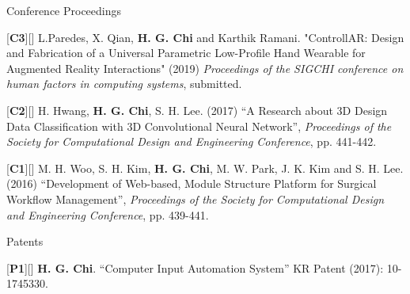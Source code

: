 \begin{cventries}
\cvpub
{Conference Proceedings} %
{ %
\begin{cvitems}
\item {[\textbf{C3}][\href{https://docs.google.com/viewer?url=https://github.com/stnoah1/CV/raw/master/documents/ControllAR.pdf}{}] L.Paredes, X. Qian, \textbf{H. G. Chi} and Karthik Ramani. "ControllAR: Design and Fabrication of a Universal Parametric Low-Profile Hand Wearable for Augmented Reality Interactions" (2019) \textit{Proceedings of the SIGCHI conference on human factors in computing systems}, submitted.}
\item {[\textbf{C2}][\href{https://docs.google.com/viewer?url=https://github.com/stnoah1/CV/raw/master/documents/3DM.pdf}{}] H. Hwang, \textbf{H. G. Chi}, S. H. Lee. (2017) “A Research about 3D Design Data Classification with 3D Convolutional Neural Network”, \textit{Proceedings of the Society for Computational Design and Engineering Conference}, pp. 441-442.}
\item {[\textbf{C1}][\href{https://docs.google.com/viewer?url=https://github.com/stnoah1/CV/raw/master/documents/SWORM.pdf}{}] M. H. Woo, S. H. Kim, \textbf{H. G. Chi}, M. W. Park, J. K. Kim and S. H. Lee. (2016) “Development of Web-based, Module Structure Platform for Surgical Workflow Management”, \textit{Proceedings of the Society for Computational Design and Engineering Conference}, pp. 439-441.}
\end{cvitems}
}


\cvpub
{Patents}{
\begin{cvitems}
\item {[\textbf{P1}][\href{https://docs.google.com/viewer?url=https://github.com/stnoah1/CV/raw/master/documents/patent.pdf}{}] \textbf{H. G. Chi}.  “Computer Input Automation System” KR Patent (2017): 10-1745330.}
\end{cvitems}
}



\end{cventries}